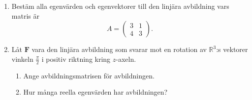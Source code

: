 \documentclass[11pt]{article}
\begin{document}
\begin{enumerate}[label=(\alph*)]
    \item Bestäm alla egenvärden och egenvektorer till den linjära avbildning vars matris är\\
        \[
            A = \begin{pmatrix}
                3 & 1\\
                4 & 3
            \end{pmatrix}.
        \]
    \item Låt $\mathbf{F}$ vara den linjära avbildning som svarar mot en rotation av $\mathbb{R}^3$:s vektorer vinkeln $\frac{\pi}{2}$ i positiv riktning kring $z$-axeln.
    \begin{enumerate}[label=\roman*.]
        \item Ange avbildningsmatrisen för avbildningen.
        \item Hur många reella egenvärden har avbildningen?
    \end{enumerate}
\end{enumerate}
\end{document}
